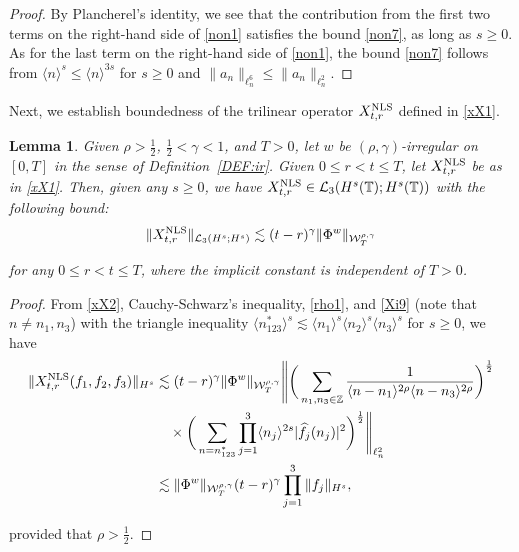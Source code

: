 \documentclass[letterpaper, 11pt,  reqno]{amsart}
\newtheorem{lemma}[theorem]{Lemma}
\newcommand{\1}{\hspace{0.5mm}\text{I}\hspace{0.5mm}}
\newcommand{\noi}{\noindent}
\newcommand{\Z}{\mathbb{Z}}
\newcommand{\T}{\mathbb{T}}
\renewcommand{\L}{\mathcal{L}}
\newcommand{\g}{\gamma}
\newcommand{\ft}{\widehat}
\renewcommand{\l}{\ell}
\newcommand{\les}{\lesssim}
\newcommand{\jb}[1]
{\langle #1 \rangle}
\newcommand{\W}{\mathcal{W}}
\newcommand{\NLS}{\text{\rm NLS} }
\numberwithin{equation}{section}
\numberwithin{theorem}{section}
\begin{document}
\begin{proof}
By Plancherel's identity, we see that the contribution from the first two terms on the right-hand side of \eqref{non1}
satisfies the bound \eqref{non7}, 
as long as $s \ge 0$.
As for the 
last term on the right-hand side of \eqref{non1}, 
the bound \eqref{non7} follows from $\jb{n}^s \le \jb{n}^{3s }$
for $s \ge 0$
and $\| a_n \|_{\l^6_n}\le \| a_n \|_{\l^2_n}$.
\end{proof}







Next, we establish boundedness of 
the trilinear operator  $X^\NLS_{t, r}$
defined in  \eqref{xX1}.











\begin{lemma}\label{LEM:nonlin8}
Given $\rho > \frac 12 $,  $\frac12< \g < 1$, and $T> 0$, 
let  $w$ be $(\rho,\g)$-irregular on $[0, T]$ in the sense of Definition~\ref{DEF:ir}.
Given $0 \le r < t \le T$, let $X^\NLS_{t, r}$
be as in \eqref{xX1}.
Then, 
given any $s \ge 0$, 
we have $X_{t, r}^\NLS \in \L_3(H^s(\T); H^{s}(\T))$
with the following bound\textup{:}
\begin{align*}
 \|X^\NLS_{t, r}\|_{\L_3(H^s; H^{s})}
\les 
(t-r)^\g  \|\Phi^w\|_{  \W^{\rho,\g}_T}
\end{align*}

\noi
for any $0 \le r < t \le T$, 
where the implicit constant is independent of $T > 0$.





\end{lemma}

\begin{proof}

From 
\eqref{xX2},  Cauchy-Schwarz's inequality, 
\eqref{rho1}, and \eqref{Xi9} (note that $n \ne n_1, n_3$)
with the triangle inequality
 $\jb{n_{123}^*}^s \les \jb{n_1}^s\jb{n_2}^s\jb{n_3}^s$
for $s \ge 0$, 
we have 
\begin{align*}
\| X^\NLS_{t,r}  ( f _1, f _2, f_3) \|_{H^s}
& \les 
(t - r)^\g
\|\Phi^w\|_{  \W^{\rho,\g}_T} 
\Bigg\|\bigg( \sum_{n_1, n_3 \in \Z}
\frac {1}{\jb{n - n_1}^{2\rho}\jb{n - n_3}^{2\rho}}
\bigg)^\frac 12\\
& \quad \times \bigg(  
\sum_{n = n_{123}^*}
\prod_{j = 1}^3
\jb{n_j}^{2s}
 |\ft  f_j ( n_j )|^2\bigg)^\frac 12 
 \Bigg\|_{\l^2_n}\\
 & \les
 \|\Phi^w\|_{  \W^{\rho,\g}_T} 
(t - r)^\g
\prod_{j = 1}^3 \|f_j\|_{H^s}, 
\end{align*}

\noi
provided that $\rho > \frac 12$.
\end{proof}
\end{document}
